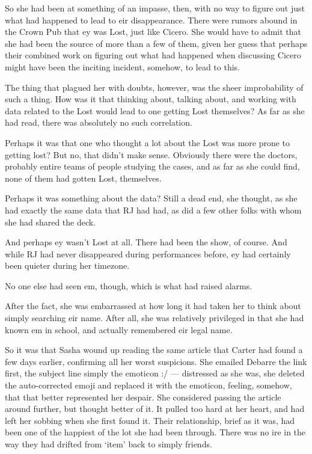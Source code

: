So she had been at something of an impasse, then, with no way to figure out just what had happened to lead to eir disappearance. There were rumors abound in the Crown Pub that ey was Lost, just like Cicero. She would have to admit that she had been the source of more than a few of them, given her guess that perhaps their combined work on figuring out what had happened when discussing Cicero might have been the inciting incident, somehow, to lead to this.

The thing that plagued her with doubts, however, was the sheer improbability of such a thing. How was it that thinking about, talking about, and working with data related to the Lost would lead to one getting Lost themselves? As far as she had read, there was absolutely no such correlation.

Perhaps it was that one who thought a lot about the Lost was more prone to getting lost? But no, that didn't make sense. Obviously there were the doctors, probably entire teams of people studying the cases, and as far as she could find, none of them had gotten Lost, themselves.

Perhaps it was something about the data? Still a dead end, she thought, as she had exactly the same data that RJ had had, as did a few other folks with whom she had shared the deck.

And perhaps ey wasn't Lost at all. There had been the show, of course. And while RJ had never disappeared during performances before, ey had certainly been quieter during her timezone.

No one else had seen em, though, which is what had raised alarms.

After the fact, she was embarrassed at how long it had taken her to think about simply searching eir name. After all, she was relatively privileged in that she had known em in school, and actually remembered eir legal name.

So it was that Sasha wound up reading the same article that Carter had found a few days earlier, confirming all her worst suspicions. She emailed Debarre the link first, the subject line simply the emoticon :/ --- distressed as she was, she deleted the auto-corrected emoji and replaced it with the emoticon, feeling, somehow, that that better represented her despair. She considered passing the article around further, but thought better of it. It pulled too hard at her heart, and had left her sobbing when she first found it. Their relationship, brief as it was, had been one of the happiest of the lot she had been through. There was no ire in the way they had drifted from `item' back to simply friends.

